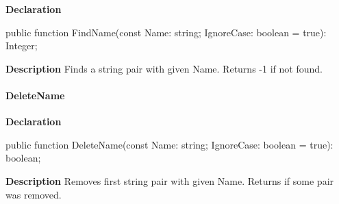 \documentclass{report}
\newif\ifpdf
\begin{document}
\label{PasDoc_StringPairVector.TStringPairVector-FindName}
\begin{list}{}{
\setlength{\itemindent}{0cm}
\setlength{\listparindent}{0cm}
\setlength{\leftmargin}{\evensidemargin}
\addtolength{\leftmargin}{\tmplength}
\settowidth{\labelsep}{X}
\addtolength{\leftmargin}{\labelsep}
\setlength{\labelwidth}{\tmplength}
}
\item[\textbf{Declaration}\hfill]
\ifpdf
\begin{flushleft}
\fi
\begin{ttfamily}
public function FindName(const Name: string; IgnoreCase: boolean = true): Integer;\end{ttfamily}

\ifpdf
\end{flushleft}
\fi

\par
\item[\textbf{Description}]
Finds a string pair with given Name. Returns {-}1 if not found.

\end{list}
\paragraph*{DeleteName}\hspace*{\fill}

\label{PasDoc_StringPairVector.TStringPairVector-DeleteName}
\begin{list}{}{
\setlength{\itemindent}{0cm}
\setlength{\listparindent}{0cm}
\setlength{\leftmargin}{\evensidemargin}
\addtolength{\leftmargin}{\tmplength}
\settowidth{\labelsep}{X}
\addtolength{\leftmargin}{\labelsep}
\setlength{\labelwidth}{\tmplength}
}
\item[\textbf{Declaration}\hfill]
\ifpdf
\begin{flushleft}
\fi
\begin{ttfamily}
public function DeleteName(const Name: string; IgnoreCase: boolean = true): boolean;\end{ttfamily}

\ifpdf
\end{flushleft}
\fi

\par
\item[\textbf{Description}]
Removes first string pair with given Name. Returns if some pair was removed.

\end{list}
\end{document}
